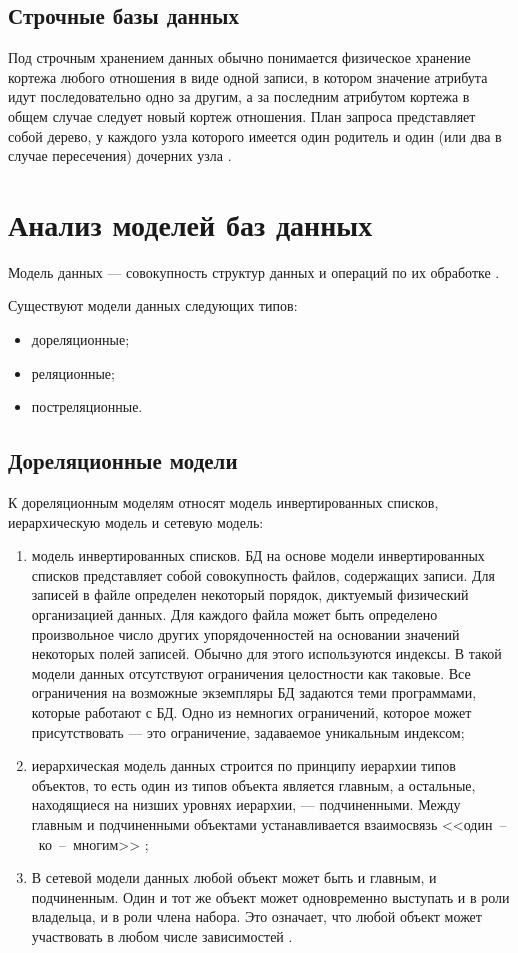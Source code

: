 \subsection{Строчные базы данных}
Под строчным хранением данных обычно понимается физическое хранение кортежа любого отношения в виде одной записи, в котором значение атрибута идут последовательно одно за другим, а за последним атрибутом кортежа в общем случае следует новый кортеж отношения.
План запроса представляет собой дерево, у каждого узла которого имеется один родитель и один (или два в случае пересечения) дочерних узла
\cite{strokovie_and_kolonochnie_bd}.



\section{Анализ моделей баз данных}
Модель данных --- совокупность структур данных и операций по их обработке \cite{dbms}.

Существуют модели данных следующих типов:
\begin{itemize}
	\item дореляционные;
	\item реляционные;
	\item постреляционные.
\end{itemize}

\subsection{Дореляционные модели}
К дореляционным моделям относят модель инвертированных списков, иерархическую модель и сетевую модель:

\begin{enumerate}
	\item модель инвертированных списков.
	БД на основе модели инвертированных списков представляет собой совокупность файлов, содержащих записи.
	Для записей в файле определен некоторый порядок, диктуемый физический организацией данных.
	Для каждого файла может быть определено произвольное число других упорядоченностей на основании значений некоторых полей записей.
	Обычно для этого используются индексы.
	В такой модели данных отсутствуют ограничения целостности как таковые.
	Все ограничения на возможные экземпляры БД задаются теми программами, которые работают с БД.
	Одно из немногих ограничений, которое может присутствовать --- это ограничение, задаваемое уникальным индексом;
	
	\item иерархическая модель данных строится по принципу иерархии типов объектов, то есть один из типов объекта является главным, а остальные, находящиеся на низших уровнях иерархии, --- подчиненными.
	Между главным и подчиненными объектами устанавливается взаимосвязь <<один~--~ко~--~многим>> \cite{dbms};
	
	\item В сетевой модели данных любой объект может быть и главным, и подчиненным.
	Один и тот же объект может одновременно выступать и в роли владельца, и в роли члена набора.
	Это означает, что любой объект может участвовать в любом числе зависимостей \cite{dbms}.
\end{enumerate}

